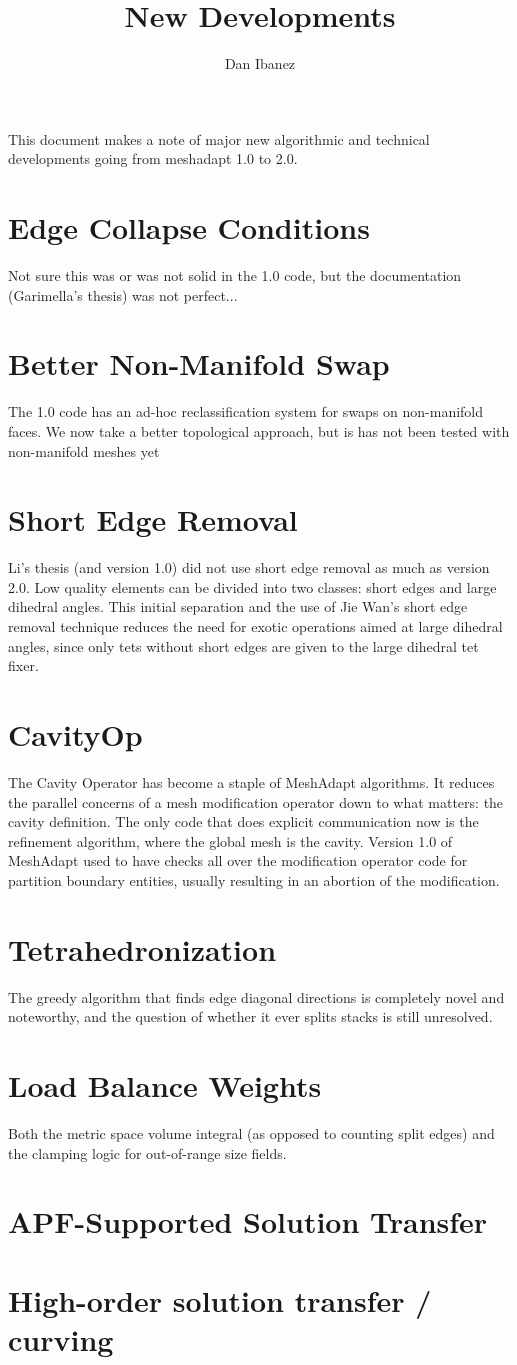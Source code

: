 \documentclass{article}
\title{New Developments}
\author{Dan Ibanez}
\begin{document}
\maketitle
This document makes a note of major new algorithmic and technical
developments going from meshadapt 1.0 to 2.0.

\section{Edge Collapse Conditions}
Not sure this was or was not solid in the 1.0 code, but
the documentation (Garimella's thesis) was not perfect...
\section{Better Non-Manifold Swap}
The 1.0 code has an ad-hoc reclassification system for
swaps on non-manifold faces.
We now take a better topological approach, but is has not
been tested with non-manifold meshes yet
\section{Short Edge Removal}
Li's thesis (and version 1.0) did not use short edge removal
as much as version 2.0.
Low quality elements can be divided into two classes:
short edges and large dihedral angles.
This initial separation and the use of Jie Wan's short
edge removal technique reduces the need for exotic operations
aimed at large dihedral angles,
since only tets without short edges are given to the large
dihedral tet fixer.
\section{CavityOp}
The Cavity Operator has become a staple of MeshAdapt algorithms.
It reduces the parallel concerns of a mesh modification operator
down to what matters: the cavity definition.
The only code that does explicit communication now is the
refinement algorithm, where the global mesh is the cavity.
Version 1.0 of MeshAdapt used to have checks all over the modification
operator code for partition boundary entities, usually resulting
in an abortion of the modification.
\section{Tetrahedronization}
The greedy algorithm that finds edge diagonal directions is completely
novel and noteworthy, and the question of whether it ever splits stacks
is still unresolved.
\section{Load Balance Weights}
Both the metric space volume integral (as opposed to counting split edges)
and the clamping logic for out-of-range size fields.
\section{APF-Supported Solution Transfer}
\section{High-order solution transfer / curving}
\end{document}
